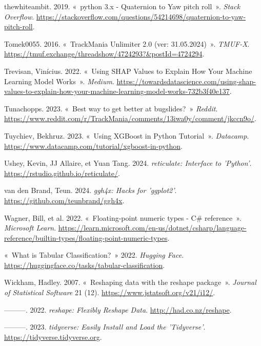 \documentclass[
  oneside,
  open=any]{scrreprt}
\newlength{\cslhangindent}
\newenvironment{CSLReferences}[2] %
 {\begin{list}{}{%
  \setlength{\itemindent}{0pt}
  \setlength{\leftmargin}{0pt}
  \setlength{\parsep}{0pt}
  \ifodd #1
   \setlength{\leftmargin}{\cslhangindent}
   \setlength{\itemindent}{-1\cslhangindent}
  \fi
  \setlength{\itemsep}{#2\baselineskip}}}
 {\end{list}}
\begin{document}
\begin{CSLReferences}{1}{0}
thewhiteambit. 2019. {«~python 3.x - Quaternion to Yaw pitch roll~»}.
\emph{Stack Overflow}.
\url{https://stackoverflow.com/questions/54214698/quaternion-to-yaw-pitch-roll}.

Tomek0055. 2016. {«~TrackMania Unlimiter 2.0 (ver: 31.05.2024)~»}.
\emph{TMUF-X}.
\url{https://tmuf.exchange/threadshow/4724293?&postId=4724294}.

Trevisan, Vinícius. 2022. {«~Using SHAP Values to Explain How Your
Machine Learning Model Works~»}. \emph{Medium}.
\url{https://towardsdatascience.com/using-shap-values-to-explain-how-your-machine-learning-model-works-732b3f40e137}.

Tunachopps. 2023. {«~Best way to get better at bugslides?~»}
\emph{Reddit}.
\url{https://www.reddit.com/r/TrackMania/comments/13iwa0y/comment/jkccn9o/}.

Tuychiev, Bekhruz. 2023. {«~Using XGBoost in Python Tutorial~»}.
\emph{Datacamp}.
\url{https://www.datacamp.com/tutorial/xgboost-in-python}.

Ushey, Kevin, JJ Allaire, et Yuan Tang. 2024. \emph{reticulate:
Interface to 'Python'}. \url{https://rstudio.github.io/reticulate/}.

van den Brand, Teun. 2024. \emph{ggh4x: Hacks for 'ggplot2'}.
\url{https://github.com/teunbrand/ggh4x}.

Wagner, Bill, et al. 2022. {«~Floating-point numeric types - C\#
reference~»}. \emph{Microsoft Learn}.
\url{https://learn.microsoft.com/en-us/dotnet/csharp/language-reference/builtin-types/floating-point-numeric-types}.

{«~What is Tabular Classification?~»} 2022. \emph{Hugging Face}.
\url{https://huggingface.co/tasks/tabular-classification}.

Wickham, Hadley. 2007. {«~Reshaping data with the reshape package~»}.
\emph{Journal of Statistical Software} 21 (12).
\url{https://www.jstatsoft.org/v21/i12/}.

---------. 2022. \emph{reshape: Flexibly Reshape Data}.
\url{http://had.co.nz/reshape}.

---------. 2023. \emph{tidyverse: Easily Install and Load the
'Tidyverse'}. \url{https://tidyverse.tidyverse.org}.


\end{CSLReferences}
\end{document}
